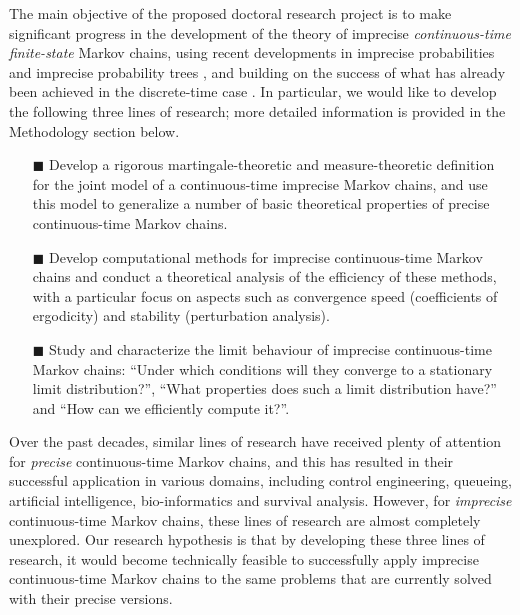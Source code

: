 \documentclass[11pt,dvipsnames,usenames,a4paper]{article}
\begin{document}
The main objective of the proposed doctoral research project is to make significant progress in the development of the theory of imprecise \emph{continuous-time} \emph{finite-state} Markov chains, using recent developments in imprecise probabilities \cite{augustin2013:itip,troffaes2013:lp} and imprecise probability trees \cite{shafer2001,cooman2007d}, and building on the success of what has already been achieved in the discrete-time case \cite{cooman2008,hermans2012,skulj2013,cooman2015:markovergodic}. In particular, we would like to develop the following three lines of research; more detailed information is provided in the Methodology section below.

\vspace{6pt}
\begin{itemize}
\item[\tiny$\blacksquare$]
Develop a rigorous martingale-theoretic and measure-theoretic definition for the joint model of a continuous-time imprecise Markov chains, and use this model to generalize a number of basic theoretical properties of precise continuous-time Markov chains.
\item[\tiny$\blacksquare$]
Develop computational methods for imprecise continuous-time Markov chains and conduct a theoretical analysis of the efficiency of these methods, with a particular focus on aspects such as convergence speed (coefficients of ergodicity) and stability (perturbation analysis).
\item[\tiny$\blacksquare$]
Study and characterize the limit behaviour of imprecise continuous-time Markov chains: ``Under which conditions will they converge to a stationary limit distribution?'', ``What properties does such a limit distribution have?'' and ``How can we efficiently compute it?''. 
\end{itemize}
\vspace{6pt}

Over the past decades, similar lines of research have received plenty of attention for \emph{precise} continuous-time Markov chains, and this has resulted in their successful application in various domains, including control engineering, queueing, artificial intelligence, bio-informatics and survival analysis.
However, for \emph{imprecise} continuous-time Markov chains, these lines of research are almost completely unexplored.
Our research hypothesis is that by developing these three lines of research, it would become technically feasible to successfully apply imprecise continuous-time Markov chains to the same problems that are currently solved with their precise versions.
\end{document}
